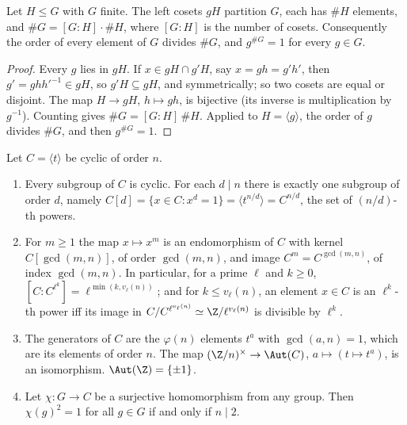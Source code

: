 \begin{proposition}[Lagrange]\label{prop:groups:lagrange}
Let $H\le G$ with $G$ finite. The left cosets $gH$ partition $G$, each has $\#H$ elements, and $\#G=[G:H]\cdot\#H$, where $[G:H]$ is the
number of cosets. Consequently the order of every element of $G$ divides $\#G$, and $g^{\#G}=1$ for every $g\in G$.
\end{proposition}

\begin{proof}
Every $g$ lies in $gH$. If $x\in gH\cap g'H$, say $x=gh=g'h'$, then $g'=gh h'^{-1}\in gH$, so $g'H\subseteq gH$, and symmetrically; so two cosets
are equal or disjoint. The map $H\to gH$, $h\mapsto gh$, is bijective (its inverse is multiplication by $g^{-1}$). Counting gives
$\#G=[G:H]\,\#H$. Applied to $H=\langle g\rangle$, the order of $g$ divides $\#G$, and then $g^{\#G}=1$.
\end{proof}

\begin{theorem}\label{thm:groups:cyclic}
Let $C=\langle t\rangle$ be cyclic of order $n$.
\begin{enumerate}[label=(\roman*)]
\item Every subgroup of $C$ is cyclic. For each $d\mid n$ there is exactly one subgroup of order $d$, namely
$C[d]=\{x\in C:x^d=1\}=\langle t^{n/d}\rangle=C^{n/d}$, the set of $(n/d)$-th powers.
\item For $m\ge1$ the map $x\mapsto x^m$ is an endomorphism of $C$ with kernel $C[\gcd(m,n)]$, of order $\gcd(m,n)$, and image
$C^m=C^{\gcd(m,n)}$, of index $\gcd(m,n)$. In particular, for a prime $\ell$ and $k\ge0$, $[C:C^{\ell^k}]=\ell^{\min(k,v_\ell(n))}$; and for
$k\le v_\ell(n)$, an element $x\in C$ is an $\ell^k$-th power iff its image in $C/C^{\ell^{v_\ell(n)}}\simeq\Z/\ell^{v_\ell(n)}$ is divisible by $\ell^k$.
\item The generators of $C$ are the $\varphi(n)$ elements $t^a$ with $\gcd(a,n)=1$, which are its elements of order $n$. The map
$(\Z/n)^\times\to\Aut(C)$, $a\mapsto(t\mapsto t^a)$, is an isomorphism. $\Aut(\Z)=\{\pm1\}$.
\item Let $\chi\colon G\to C$ be a surjective homomorphism from any group. Then $\chi(g)^2=1$ for all $g\in G$ if and only if $n\mid2$.
\end{enumerate}
\end{theorem}

